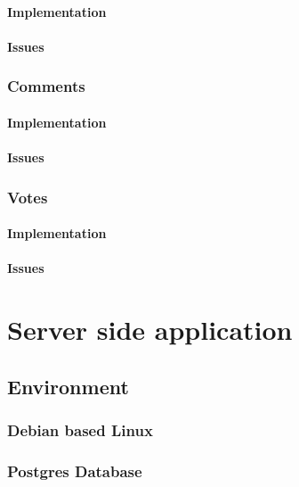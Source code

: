 \paragraph*{Implementation}

\paragraph*{Issues}


\subsubsection*{Comments}

\paragraph*{Implementation}

\paragraph*{Issues}


\subsubsection*{Votes}

\paragraph*{Implementation}

\paragraph*{Issues}



\section{Server side application}


\subsection{Environment}

\subsubsection{Debian based Linux}

\subsubsection{Postgres Database}

